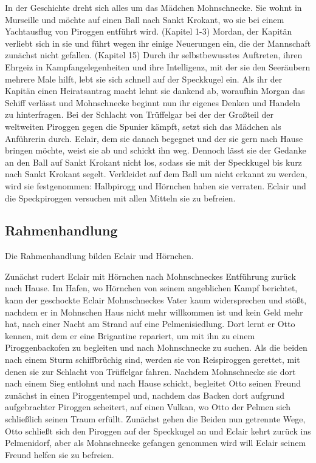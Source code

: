{In der Geschichte dreht sich alles um das Mädchen Mohnschnecke. Sie wohnt in Murseille und möchte auf einen Ball nach Sankt Krokant, wo sie bei einem Yachtausflug von Piroggen entführt wird. (Kapitel 1-3) Mordan, der Kapitän verliebt sich in sie und führt wegen ihr einige Neuerungen ein, die der Mannschaft zunächst nicht gefallen. (Kapitel 15) Durch ihr selbstbewusstes Auftreten, ihren Ehrgeiz in Kampfangelegenheiten und ihre Intelligenz, mit der sie den Seeräubern mehrere Male hilft, lebt sie sich schnell auf der Speckkugel ein. Als ihr der Kapitän einen Heiratsantrag macht lehnt sie dankend ab, woraufhin Morgan das Schiff verlässt und Mohnschnecke beginnt nun ihr eigenes Denken und Handeln zu hinterfragen. Bei der Schlacht von Trüffelgar bei der der Großteil der weltweiten Piroggen gegen die Spunier kämpft, setzt sich das Mädchen als Anführerin durch. Eclair, dem sie danach begegnet und der sie gern nach Hause bringen möchte, weist sie ab und schickt ihn weg. Dennoch lässt sie der Gedanke an den Ball auf Sankt Krokant nicht los, sodass sie mit der Speckkugel bis kurz nach Sankt Krokant segelt. Verkleidet auf dem Ball um nicht erkannt zu werden, wird sie festgenommen: Halbpirogg und Hörnchen haben sie verraten. Eclair und die Speckpiroggen versuchen mit allen Mitteln sie zu befreien.

\subsection{Rahmenhandlung}

Die Rahmenhandlung bilden Eclair und Hörnchen.

Zunächst rudert Eclair mit Hörnchen nach Mohnschneckes Entführung zurück nach Hause. Im Hafen, wo Hörnchen von seinem angeblichen Kampf berichtet, kann der geschockte Eclair Mohnschneckes Vater kaum widersprechen und stößt, nachdem er in Mohnschen Haus nicht mehr willkommen ist und kein Geld mehr hat, nach einer Nacht am Strand auf eine Pelmenisiedlung. Dort lernt er Otto kennen, mit dem er eine Brigantine repariert, um mit ihn zu einem Piroggenbackofen zu begleiten und nach Mohnschnecke zu suchen. Als die beiden nach einem Sturm schiffbrüchig sind, werden sie von Reispiroggen gerettet, mit denen sie zur Schlacht von Trüffelgar fahren. Nachdem Mohnschnecke sie dort nach einem Sieg entlohnt und nach Hause schickt, begleitet Otto seinen Freund zunächst in einen Piroggentempel und, nachdem das Backen dort aufgrund aufgebrachter Piroggen scheitert, auf einen Vulkan, wo Otto der Pelmen sich schließlich seinen Traum erfüllt. Zunächst gehen die Beiden nun getrennte Wege, Otto schließt sich den Piroggen auf der Speckkugel an und Eclair kehrt zurück ins Pelmenidorf, aber als Mohnschnecke gefangen genommen wird will Eclair seinem Freund helfen sie zu befreien.

}
